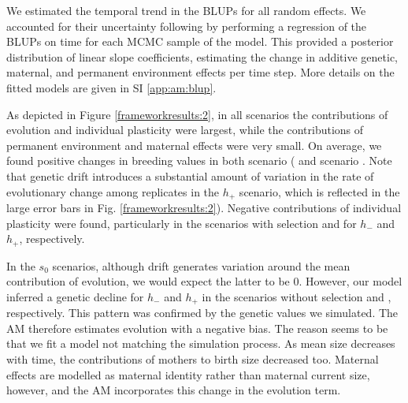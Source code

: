 We estimated the temporal trend in the BLUPs for all random effects. We accounted for their uncertainty following \cite{Hadfield2010b} by performing a regression of the BLUPs on time for each MCMC sample of the model. This provided a posterior distribution of linear slope coefficients, estimating the change in additive genetic, maternal, and permanent environment effects per time step. More details on the fitted models are given in SI \ref{app:am:blup}.

As depicted in Figure \ref{frameworkresults:2}, in all scenarios the contributions of evolution and individual plasticity were largest, while the contributions of permanent environment and maternal effects were very small. On average, we found positive changes in breeding values in both scenario \Sh  ( and scenario \SH {}. Note that genetic drift introduces a substantial amount of variation in the rate of evolutionary change among replicates in the $h_+$ scenario, which is reflected in the large error bars in Fig. \ref{frameworkresults:2}). Negative contributions of individual plasticity were found, particularly in the scenarios with selection  and  for $h_{-}$ and $h_+$, respectively.

In the $s_0$ scenarios, although drift generates variation around the mean contribution of evolution, we would expect the latter to be 0. However, our model inferred  a genetic decline for $h_{-}$ and $h_+$ in the scenarios without selection  and , respectively.
 This pattern was confirmed by the genetic values we simulated. The AM therefore estimates evolution with a negative bias. The reason seems to be that we fit a model not matching the simulation process. As mean size decreases with time, the contributions of mothers to birth size decreased too. Maternal effects are modelled as maternal identity rather than maternal current size, however, and the AM incorporates this change in the evolution term. 

